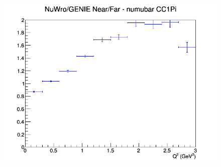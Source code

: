 \begin{figure}[h]
\endminipage
{}
\includegraphics[width=\linewidth]{Q2/nominal/ratios/CC1Pi_NuWro_GENIE_numubar_NF_Q2.png}
\endminipage
\newline
\end{figure}
\clearpage
